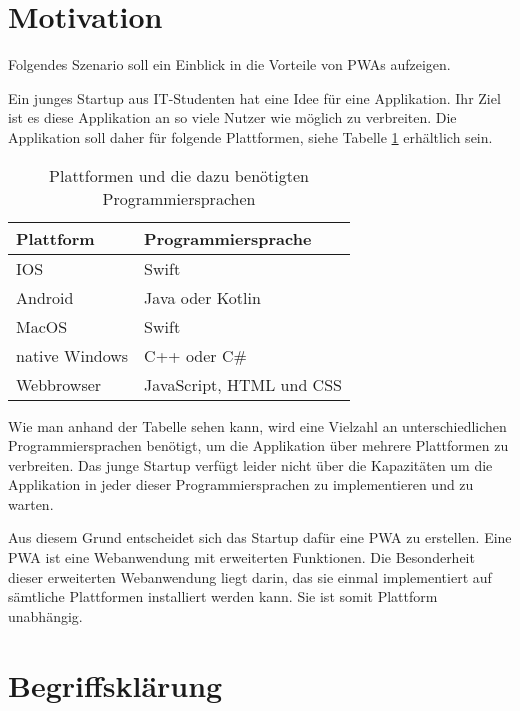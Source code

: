 
\section{Motivation} \label{se:Motivation}

Folgendes Szenario soll ein Einblick in die Vorteile von \ac{PWAs} aufzeigen. 

Ein junges Startup aus IT-Studenten hat eine Idee für eine Applikation. Ihr Ziel ist es diese Applikation an so viele Nutzer wie möglich zu verbreiten. Die Applikation soll daher für folgende Plattformen, siehe Tabelle \ref{plattformen} erhältlich sein.

\begin{table}[!htb]\label{plattformen}
\begin{tabularx}{\textwidth}{|X|X|}
    \hline
    \textbf{Plattform} & \textbf{Programmiersprache} \\
    \hline
    \hline
    IOS & Swift \\
    \hline
    Android & Java oder Kotlin\\
    \hline
    MacOS & Swift \\
    \hline 
    native Windows & C++ oder C\# \\
    \hline
    Webbrowser & JavaScript, HTML und CSS \\
    \hline
\end{tabularx}
\caption{Plattformen und die dazu benötigten Programmiersprachen}
\end{table}

Wie man anhand der Tabelle sehen kann, wird eine Vielzahl an unterschiedlichen Programmiersprachen benötigt, um die Applikation über mehrere Plattformen zu verbreiten. Das junge Startup verfügt leider nicht über die Kapazitäten um die Applikation in jeder dieser Programmiersprachen zu implementieren und zu warten. 

Aus diesem Grund entscheidet sich das Startup dafür eine \ac{PWA} zu erstellen. Eine PWA ist eine Webanwendung mit erweiterten Funktionen. Die Besonderheit dieser erweiterten Webanwendung liegt darin, das sie einmal implementiert auf sämtliche Plattformen installiert werden kann. Sie ist somit Plattform unabhängig. 

\section{Begriffsklärung}\label{se:Begriffsklaerung}

